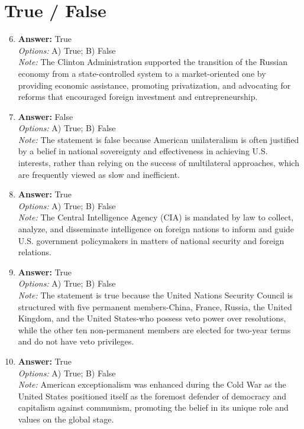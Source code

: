 \documentclass[12pt]{article}
\begin{document}
\section*{True / False}
\begin{enumerate}[label=\arabic*.]
\setcounter{enumi}{5}
\item \textbf{Answer:} True
\\ \textit{Options:} A) True; B) False
\\ \textit{Note:} The Clinton Administration supported the transition of the Russian economy from a state-controlled system to a market-oriented one by providing economic assistance, promoting privatization, and advocating for reforms that encouraged foreign investment and entrepreneurship.
\item \textbf{Answer:} False
\\ \textit{Options:} A) True; B) False
\\ \textit{Note:} The statement is false because American unilateralism is often justified by a belief in national sovereignty and effectiveness in achieving U.S. interests, rather than relying on the success of multilateral approaches, which are frequently viewed as slow and inefficient.
\item \textbf{Answer:} True
\\ \textit{Options:} A) True; B) False
\\ \textit{Note:} The Central Intelligence Agency (CIA) is mandated by law to collect, analyze, and disseminate intelligence on foreign nations to inform and guide U.S. government policymakers in matters of national security and foreign relations.
\item \textbf{Answer:} True
\\ \textit{Options:} A) True; B) False
\\ \textit{Note:} The statement is true because the United Nations Security Council is structured with five permanent members-China, France, Russia, the United Kingdom, and the United States-who possess veto power over resolutions, while the other ten non-permanent members are elected for two-year terms and do not have veto privileges.
\item \textbf{Answer:} True
\\ \textit{Options:} A) True; B) False
\\ \textit{Note:} American exceptionalism was enhanced during the Cold War as the United States positioned itself as the foremost defender of democracy and capitalism against communism, promoting the belief in its unique role and values on the global stage.
\end{enumerate}
\end{document}
